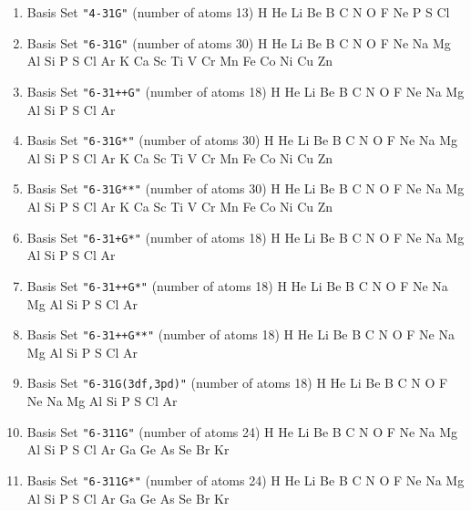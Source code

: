 \begin{enumerate}
\item Basis Set \verb#"4-31G"# (number of atoms 13) \newline
  H He Li Be B C N O F Ne P S Cl


\item Basis Set \verb#"6-31G"# (number of atoms 30) \newline
  H He Li Be B C N O F Ne Na Mg Al Si P S Cl Ar K Ca Sc Ti V Cr Mn
 Fe Co Ni Cu Zn


\item Basis Set \verb#"6-31++G"# (number of atoms 18) \newline
  H He Li Be B C N O F Ne Na Mg Al Si P S Cl Ar


\item Basis Set \verb#"6-31G*"# (number of atoms 30) \newline
  H He Li Be B C N O F Ne Na Mg Al Si P S Cl Ar K Ca Sc Ti V Cr Mn
 Fe Co Ni Cu Zn


\item Basis Set \verb#"6-31G**"# (number of atoms 30) \newline
  H He Li Be B C N O F Ne Na Mg Al Si P S Cl Ar K Ca Sc Ti V Cr Mn
 Fe Co Ni Cu Zn


\item Basis Set \verb#"6-31+G*"# (number of atoms 18) \newline
  H He Li Be B C N O F Ne Na Mg Al Si P S Cl Ar


\item Basis Set \verb#"6-31++G*"# (number of atoms 18) \newline
  H He Li Be B C N O F Ne Na Mg Al Si P S Cl Ar


\item Basis Set \verb#"6-31++G**"# (number of atoms 18) \newline
  H He Li Be B C N O F Ne Na Mg Al Si P S Cl Ar


\item Basis Set \verb#"6-31G(3df,3pd)"# (number of atoms 18) \newline
  H He Li Be B C N O F Ne Na Mg Al Si P S Cl Ar


\item Basis Set \verb#"6-311G"# (number of atoms 24) \newline
  H He Li Be B C N O F Ne Na Mg Al Si P S Cl Ar Ga Ge As Se Br Kr


\item Basis Set \verb#"6-311G*"# (number of atoms 24) \newline
  H He Li Be B C N O F Ne Na Mg Al Si P S Cl Ar Ga Ge As Se Br Kr



\end{enumerate}
